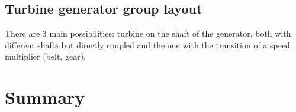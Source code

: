 \subsection{Turbine generator group layout}
There are 3 main possibilities: turbine on the shaft of the generator, both with different shafts but directly coupled and the one with the transition of a speed multiplier (belt, gear). 

\section{Summary}

